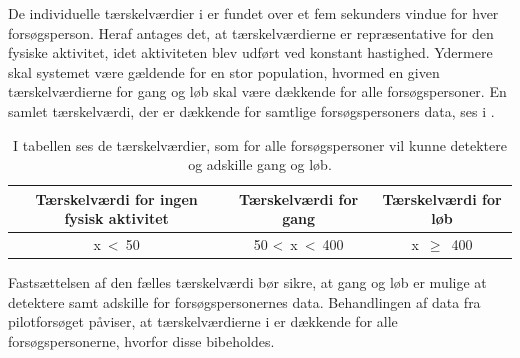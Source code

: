 De individuelle tærskelværdier i  er fundet over et fem sekunders vindue for hver forsøgsperson. Heraf antages det, at tærskelværdierne er repræsentative for den fysiske aktivitet, idet aktiviteten blev udført ved konstant hastighed. Ydermere skal systemet være gældende for en stor population, hvormed en given tærskelværdierne for gang og løb skal være dækkende for alle forsøgspersoner. En samlet tærskelværdi, der er dækkende for samtlige forsøgspersoners data, ses i .
\begin{table}[H]
	\centering
	\begin{tabular}{ccc}
		\hline
		\rowcolor[HTML]{C0C0C0} 
		Tærskelværdi for ingen fysisk aktivitet & Tærskelværdi for gang & Tærskelværdi for løb \\ \hline
		x~\textless~50 & 50 \textless~x~\textless~400 & x~$\geq$~400 \\ \hline
	\end{tabular}
	\caption{I tabellen ses de tærskelværdier, som for alle forsøgspersoner vil kunne detektere og adskille gang og løb.}
	\label{tab:faelles_taerskel}
\end{table}\vspace{-0.25cm}
Fastsættelsen af den fælles tærskelværdi bør sikre, at gang og løb er mulige at detektere samt adskille for forsøgspersonernes data. Behandlingen af data fra pilotforsøget påviser, at tærskelværdierne i  er dækkende for alle forsøgspersonerne, hvorfor disse bibeholdes.

